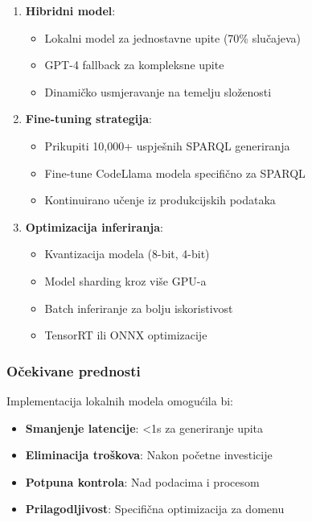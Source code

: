 \begin{enumerate}
    \item \textbf{Hibridni model}:
    \begin{itemize}
        \item Lokalni model za jednostavne upite (70\% slučajeva)
        \item GPT-4 fallback za kompleksne upite
        \item Dinamičko usmjeravanje na temelju složenosti
    \end{itemize}
    
    \item \textbf{Fine-tuning strategija}:
    \begin{itemize}
        \item Prikupiti 10,000+ uspješnih SPARQL generiranja
        \item Fine-tune CodeLlama modela specifično za SPARQL
        \item Kontinuirano učenje iz produkcijskih podataka
    \end{itemize}
    
    \item \textbf{Optimizacija inferiranja}:
    \begin{itemize}
        \item Kvantizacija modela (8-bit, 4-bit)
        \item Model sharding kroz više GPU-a
        \item Batch inferiranje za bolju iskoristivost
        \item TensorRT ili ONNX optimizacije
    \end{itemize}
\end{enumerate}

\subsubsection{Očekivane prednosti}

Implementacija lokalnih modela omogućila bi:

\begin{itemize}
    \item \textbf{Smanjenje latencije}: <1s za generiranje upita
    \item \textbf{Eliminacija troškova}: Nakon početne investicije
    \item \textbf{Potpuna kontrola}: Nad podacima i procesom
    \item \textbf{Prilagodljivost}: Specifična optimizacija za domenu
\end{itemize}


